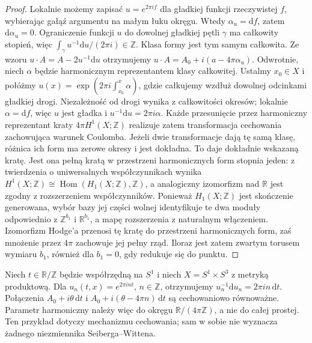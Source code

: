 \begin{proof}
Lokalnie możemy zapisać $u=e^{2\pi i f}$ dla
gładkiej funkcji rzeczywistej $f$, wybierając gałąź
argumentu na małym łuku okręgu. Wtedy
$\alpha_u=\mathrm df$, zatem $\mathrm d\alpha_u=0$.
Ograniczenie funkcji $u$ do dowolnej gładkiej pętli
$\gamma$ ma całkowity stopień, więc
$\int_\gamma u^{-1}\mathrm du/(2\pi i)\in\mathbb Z$.
Klasa formy jest tym samym całkowita. Ze wzoru
$u\cdot A=A-2u^{-1}\mathrm du$ otrzymujemy
$u\cdot A=A_0+i(a-4\pi\alpha_u)$.
Odwrotnie, niech $\alpha$ będzie harmonicznym reprezentantem
klasy całkowitej. Ustalmy $x_0\in X$ i połóżmy
$u(x)=\exp(2\pi i\int_{x_0}^x\alpha)$,
gdzie całkujemy wzdłuż dowolnej odcinkami gładkiej
drogi. Niezależność od drogi wynika z całkowitości
okresów; lokalnie $\alpha=\mathrm df$, więc
$u$ jest gładka i $u^{-1}\mathrm du=2\pi i\alpha$.
Każde przesunięcie przez harmoniczny reprezentant
kraty $4\pi H^1(X;\mathbb Z)$ realizuje zatem
transformacja cechowania zachowująca warunek Coulomba.
Jeżeli dwie transformacje dają tę samą klasę,
różnica ich form ma zerowe okresy i jest dokładna.
To daje dokładnie wskazaną kratę.
Jest ona pełną kratą w przestrzeni harmonicznych
form stopnia jeden: z twierdzenia o uniwersalnych
współczynnikach wynika
$H^1(X;\mathbb Z)\cong\operatorname{Hom}(H_1(X;\mathbb Z),\mathbb Z)$,
a analogiczny izomorfizm nad $\mathbb R$ jest zgodny
z rozszerzeniem współczynników.
Ponieważ $H_1(X;\mathbb Z)$ jest skończenie generowana,
wybór bazy jej części wolnej identyfikuje te dwa
moduły odpowiednio z $\mathbb Z^{b_1}$ i $\mathbb R^{b_1}$,
a mapę rozszerzenia z naturalnym włączeniem.
Izomorfizm Hodge'a przenosi tę kratę do przestrzeni
harmonicznych form, zaś mnożenie przez $4\pi$
zachowuje jej pełny rząd. Iloraz jest zatem zwartym
torusem wymiaru $b_1$, również dla $b_1=0$,
gdy redukuje się do punktu.
\end{proof}

\begin{przyklad}
Niech $t\in\mathbb R/\mathbb Z$ będzie współrzędną na
$S^1$ i niech $X=S^1\times S^3$ z metryką produktową.
Dla $u_n(t,x)=e^{2\pi int}$, $n\in\mathbb Z$,
otrzymujemy $u_n^{-1}\mathrm du_n=2\pi in\,\mathrm dt$.
Połączenia $A_0+i\theta\,\mathrm dt$ i
$A_0+i(\theta-4\pi n)\,\mathrm dt$ są cechowaniowo
równoważne. Parametr harmoniczny należy więc do okręgu
$\mathbb R/(4\pi\mathbb Z)$, a nie do całej prostej.
Ten przykład dotyczy mechanizmu cechowania; sam w sobie
nie wyznacza żadnego niezmiennika Seiberga--Wittena.
\end{przyklad}

